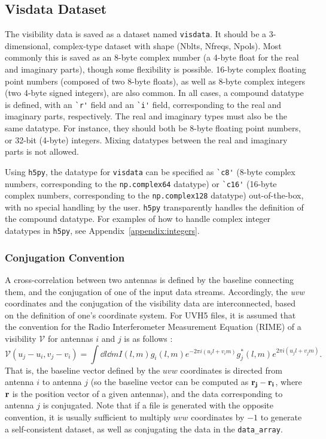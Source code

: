 \documentclass[11pt, oneside]{article}
\begin{document}
\subsection{Visdata Dataset}
\label{sec:visdata}
The visibility data is saved as a dataset named \verb+visdata+. It should be a
3-dimensional, complex-type dataset with shape (Nblts, Nfreqs, Npols). Most
commonly this is saved as an 8-byte complex number (a 4-byte float for the real
and imaginary parts), though some flexibility is possible. 16-byte complex
floating point numbers (composed of two 8-byte floats), as well as 8-byte
complex integers (two 4-byte signed integers), are also common. In all cases, a
compound datatype is defined, with an \verb+`r'+ field and an \verb+`i'+ field,
corresponding to the real and imaginary parts, respectively. The real and
imaginary types must also be the same datatype. For instance, they should both
be 8-byte floating point numbers, or 32-bit (4-byte) integers. Mixing datatypes
between the real and imaginary parts is not allowed.

Using \verb+h5py+, the datatype for \verb+visdata+ can be specified as
\verb+`c8'+ (8-byte complex numbers, corresponding to the \verb+np.complex64+
datatype) or \verb+`c16'+ (16-byte complex numbers, corresponding to the
\verb+np.complex128+ datatype) out-of-the-box, with no special handling by the
user. \verb+h5py+ transparently handles the definition of the compound
datatype. For examples of how to handle complex integer datatypes in
\verb+h5py+, see Appendix~\ref{appendix:integers}.

\subsubsection{Conjugation Convention}
A cross-correlation between two antennas is defined by the baseline connecting
them, and the conjugation of one of the input data streams. Accordingly, the
\textit{uvw} coordinates and the conjugation of the visibility data are
interconnected, based on the definition of one's coordinate system. For UVH5
files, it is assumed that the convention for the Radio Interferometer
Measurement Equation (RIME) of a visibility $\mathcal{V}$ for antennas $i$ and
$j$ is as follows \cite{tms}:
\begin{equation}
\mathcal{V}(u_j - u_i, v_j - v_i) = \int \dd{l} \dd{m} I(l, m) g_i(l, m) e^{-2\pi i (u_i l + v_i m)} g_j^*(l, m) e^{2\pi i (u_j l + v_j m)}.
\end{equation}
That is, the baseline vector defined by the $uvw$ coordinates is directed from
antenna $i$ to antenna $j$ (so the baseline vector can be computed as
$\vb{r_j} - \vb{r_i}$, where $\vb{r}$ is the position vector of a given
antennas), and the data corresponding to antenna $j$ is conjugated. Note that if
a file is generated with the opposite convention, it is usually sufficient to
multiply $uvw$ coordinates by $-1$ to generate a self-consistent dataset, as
well as conjugating the data in the \verb+data_array+.
\end{document}
